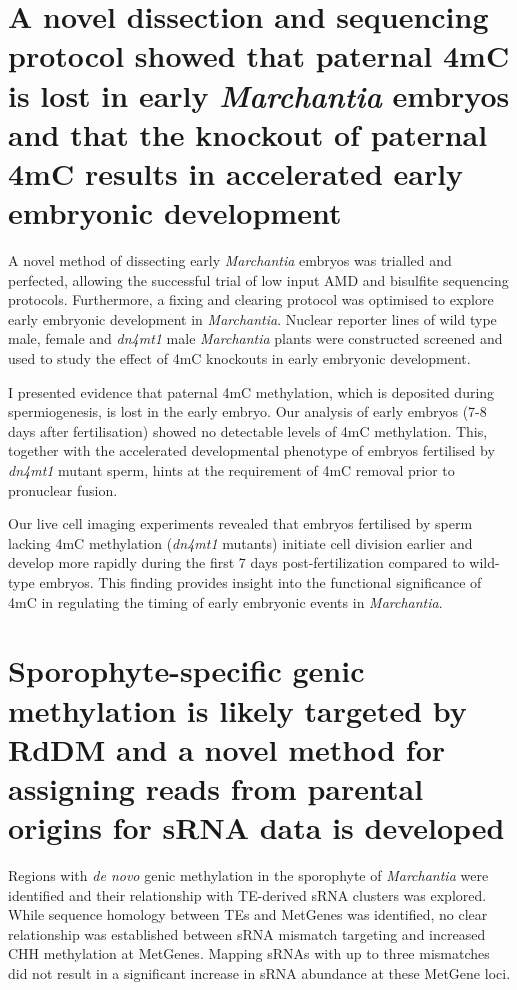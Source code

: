 \section{A novel dissection and sequencing protocol showed that paternal 4mC is lost in early \textit{Marchantia} embryos and that the knockout of paternal 4mC results in accelerated early embryonic development}

A novel method of dissecting early \textit{Marchantia} embryos was trialled and perfected, allowing the successful trial of low input AMD and bisulfite sequencing protocols. Furthermore, a fixing and clearing protocol was optimised to explore early embryonic development in \textit{Marchantia}. Nuclear reporter lines of wild type male, female and \textit{dn4mt1} male \textit{Marchantia} plants were constructed screened and used to study the effect of 4mC knockouts in early embryonic development.

I presented evidence that  paternal 4mC methylation, which is deposited during spermiogenesis, is lost in the early embryo. Our analysis of early embryos (7-8 days after fertilisation) showed no detectable levels of 4mC methylation. This, together with the accelerated developmental phenotype of embryos fertilised by \textit{dn4mt1} mutant sperm, hints at the requirement of 4mC removal prior to pronuclear fusion.

Our live cell imaging experiments revealed that embryos fertilised by sperm lacking 4mC methylation (\textit{dn4mt1} mutants) initiate cell division earlier and develop more rapidly during the first 7 days post-fertilization compared to wild-type embryos. This finding provides insight into the functional significance of 4mC in regulating the timing of early embryonic events in \textit{Marchantia}.

\section{Sporophyte-specific genic methylation is likely targeted by RdDM and a novel method for assigning reads from parental origins for sRNA data is developed}

Regions with \textit{de novo} genic methylation in the sporophyte of \textit{Marchantia} were identified and their relationship with TE-derived sRNA clusters was explored. While sequence homology between TEs and MetGenes was identified, no clear relationship was established between sRNA mismatch targeting and increased CHH methylation at MetGenes. Mapping sRNAs with up to three mismatches did not result in a significant increase in sRNA abundance at these MetGene loci.

